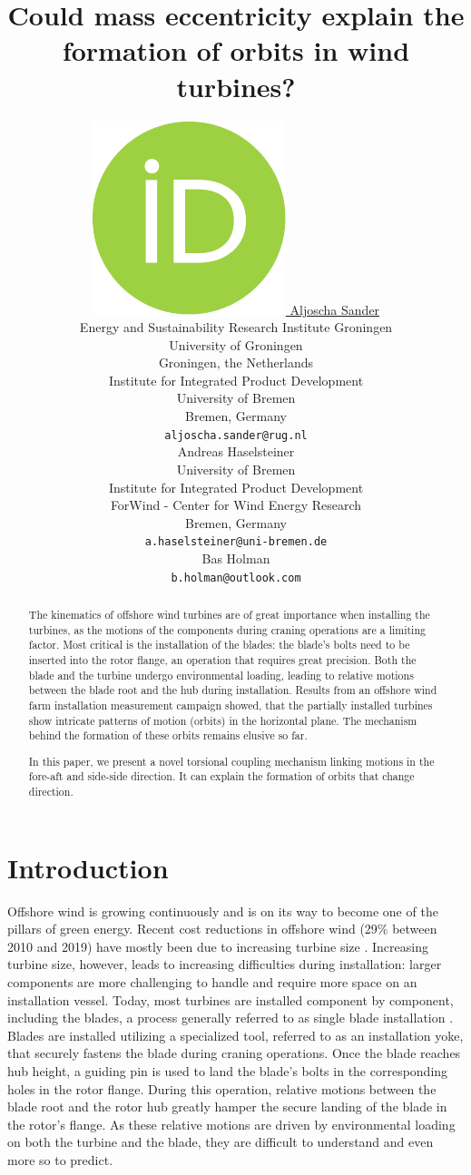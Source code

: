 \documentclass{article}
\title{Could mass eccentricity explain the formation of orbits in wind turbines?}
\author{ \href{https://orcid.org/0000-0001-8717-9688}{\includegraphics[scale=0.06]{orcid.pdf}\hspace{1mm} Aljoscha Sander} \\
	Energy and Sustainability Research Institute Groningen\\
	University of Groningen\\
	Groningen, the Netherlands \\
	Institute for Integrated Product Development \\
	University of Bremen\\
	Bremen, Germany\\
	\texttt{aljoscha.sander@rug.nl} \\
	
	\And
	Andreas Haselsteiner \\
	University of Bremen\\
	Institute for Integrated Product Development\\
	ForWind - Center for Wind Energy Research\\
	Bremen, Germany\\
	\texttt{a.haselsteiner@uni-bremen.de} \\
	\And
	Bas Holman \\
	\texttt{b.holman@outlook.com}\\
}
\begin{document}
\maketitle

\begin{abstract}

The kinematics of offshore wind turbines are of great importance when installing the turbines, as the motions of the components during craning operations are a limiting factor. Most critical is the installation of the blades: the blade's bolts need to be inserted into the rotor flange, an operation that requires great precision. Both the blade and the turbine undergo environmental loading, leading to relative motions between the blade root and the hub during installation.
Results from an offshore wind farm installation measurement campaign showed, that the partially installed turbines show intricate patterns of motion (orbits) in the horizontal plane. The mechanism behind the formation of these orbits remains elusive so far.

In this paper, we present a novel torsional coupling mechanism linking motions in the fore-aft and side-side direction. It can explain the formation of orbits that change direction. 

\end{abstract}




\section{Introduction}
\label{sec:introduction}

Offshore wind is growing continuously and is on its way to become one of the pillars of green energy. Recent cost reductions in offshore wind (29\% between 2010 and 2019) have mostly been due to increasing turbine size \citep{irenaRenewablePowerGeneration2020}. Increasing turbine size, however, leads to increasing difficulties during installation: larger components are more challenging to handle and require more space on an installation vessel. Today, most turbines are installed component by component, including the blades, a process generally referred to as single blade installation \citep{jiangInstallationOffshoreWind2021}. Blades are installed utilizing a specialized tool, referred to as an installation yoke, that securely fastens the blade during craning operations. Once the blade reaches hub height, a guiding pin is used to land the blade's bolts in the corresponding holes in the rotor flange. During this operation, relative motions between the blade root and the rotor hub greatly hamper the secure landing of the blade in the rotor's flange. As these relative motions are driven by environmental loading on both the turbine and the blade, they are difficult to understand and even more so to predict. 
\end{document}
